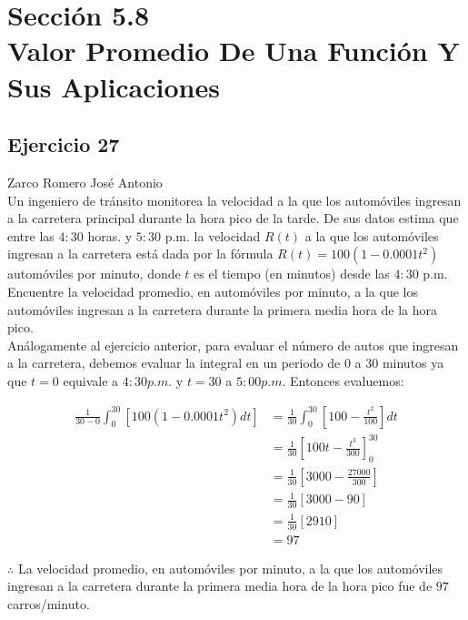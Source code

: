 \documentclass[12pt]{article}
\begin{document}
\section{Sección 5.8 \\ Valor Promedio De Una Función Y Sus Aplicaciones}
\subsection{Ejercicio 27} Zarco Romero José Antonio \\

Un ingeniero de tránsito monitorea la velocidad a la que los automóviles ingresan a la carretera principal durante la hora pico de la tarde. De sus datos estima que entre las $4:30$ horas. y $5:30$ p.m. la velocidad $R(t)$ a la que los automóviles ingresan a la carretera está dada por la fórmula $R(t) = 100(1-0.0001t^2)$ automóviles por minuto, donde $t$ es el tiempo (en minutos) desde las $4:30$ p.m. Encuentre la velocidad promedio, en automóviles por minuto, a la que los automóviles ingresan a la carretera durante la primera media hora de la hora pico. \\

Análogamente al ejercicio anterior, para evaluar el número de autos que ingresan a la carretera, debemos evaluar la integral en un periodo de 0 a 30 minutos ya que $t=0$ equivale a $4:30 p.m.$ y $t=30$ a $5:00 p.m.$ Entonces evaluemos:

\begin{align*}
  \frac{1}{30-0} \int_0^{30} \left[ 100 (1- 0.0001t^2) dt \right]
  & = \frac{1}{30} \int_0^{30} \left[ 100-\frac{t^2}{100} \right] dt \\
  & =  \frac{1}{30} \left[ 100t-\frac{t^3}{300} \right]_{0}^{30} \\
  & =  \frac{1}{30} \left[ 3000-\frac{27000}{300} \right] \\
  & =  \frac{1}{30} \left[ 3000-90 \right] \\
  & =  \frac{1}{30} \left[ 2910 \right] \\
  &= 97
\end{align*}

$\therefore $ La velocidad promedio, en automóviles por minuto, a la que los automóviles ingresan a la carretera durante la primera media hora de la hora pico fue de $97 $ carros/minuto.
\end{document}

